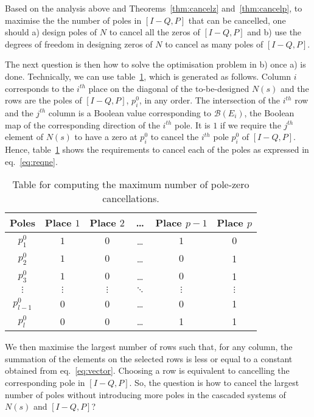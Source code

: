 \documentclass[twocolumn,12pt]{autart}
\theoremstyle{plain}
\begin{document}
Based on the analysis above and Theorems~\ref{thm:cancelz} and~\ref{thm:cancelp}, to maximise the the number of poles in $[I-Q,P]$ that can be cancelled, one should a) design poles of $N$ to cancel all the zeros of $[I-Q,P]$ and b) use the degrees of freedom in designing zeros of $N$ to cancel as many poles of $[I-Q,P]$.

The next question is then how to solve the optimisation problem in b) once a) is done. Technically, we can use table~\ref{table:example}, which is generated as follows. Column $i$ corresponds to the $i^{th}$ place on the diagonal of the to-be-designed $N(s)$ and the rows are the poles of $[I-Q,P]$,  $p_i^0$, in any order.  The intersection of the $i^{th}$ row and the $j^{th}$ column is a Boolean value corresponding to $\mathcal{B}(E_i)$, the Boolean map of the corresponding direction of the $i^{th}$ pole. It is $1$ if we require the $j^{th}$ element of $N(s)$ to have a zero at $p_i^0$ to cancel the $i^{th}$ pole $p_i^0$ of $[I-Q,P]$. Hence, table~\ref{table:example} shows the requirements to cancel each of the poles as expressed in eq.~\eqref{eq:reqne}. 
 
\begin{table}[htbp]
 \centering
 \begin{tabular}{|c|c|c|c|c|c|}
   \hline
    Poles & Place $1$& Place $2$&\ldots& Place $p-1$&  Place $p$ \\ \hline
   $p^0_{1}$ & $1$ & $0$ & \ldots & $1$ & $0$ \\ \hline
   $p^0_{2}$ & $1$ & $0$ & \ldots& $0$ & 1 \\ \hline
   $p^0_{3}$ & $1$ &  $0$ & \ldots & $0$ &  1 \\ \hline
   $\vdots$ & $\vdots$ & $\vdots$ &$\ddots$&$\vdots$ & $\vdots$\\ \hline
   $p^0_{l-1}$ & 0& 0&\ldots &0 &1 \\ \hline
   $p^0_{l}$ &0   & 0  &\ldots&1 &1  \\ \hline
 \end{tabular}
 \caption{Table for computing the maximum number of pole-zero cancellations.}
  \label{table:example}
\end{table}



We then maximise the largest number of rows such that, for any column, the summation of the elements on the selected rows is less or equal to a constant obtained from eq.~\eqref{eq:vector}. Choosing a row is equivalent to cancelling the corresponding pole in $[I-Q,P]$. So, the question is how to cancel the largest number of poles without introducing more poles in the cascaded systems of $N(s)$ and $[I-Q,P]$?
\end{document}
